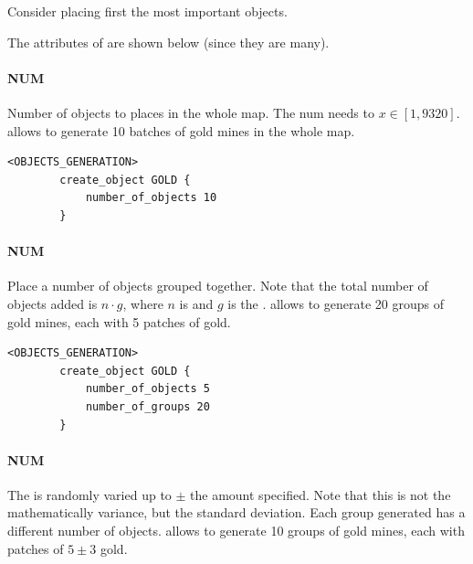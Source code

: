 \begin{appendices}
    \begin{note}
        Consider placing first the most important objects.
    \end{note}

    The attributes of  are shown below (since they are many).

    \paragraph{ NUM}

    Number of objects to places in the whole map. The num needs to $x \in [1, 9320]$.  allows to generate 10 batches of gold mines in the whole map.

    \begin{lstlisting}[language={rms}, label={lst:numerofobjects}, caption={Example showing how you can create object in the whole map.}]
        <OBJECTS_GENERATION>
        create_object GOLD {
            number_of_objects 10
        }
    \end{lstlisting}

    \paragraph{ NUM}

    Place a number of objects grouped together. Note that the total number of objects added is $n \cdot g$, where $n$ is  and $g$ is the .  allows to generate 20 groups of gold mines, each with 5 patches of gold.

    \begin{lstlisting}[language={rms}, label={lst:numerofgroups}, caption={Example showing how you can create object in the whole map, grouped together.}]
        <OBJECTS_GENERATION>
        create_object GOLD {
            number_of_objects 5
            number_of_groups 20
        }
    \end{lstlisting}

    \paragraph{ NUM}

    The  is randomly varied up to $\pm$ the amount specified. Note that this is not the mathematically variance, but the standard deviation.
    Each group generated has a different number of objects.  allows to generate 10 groups of gold mines, each with patches of $5 \pm 3$ gold.


\end{appendices}

